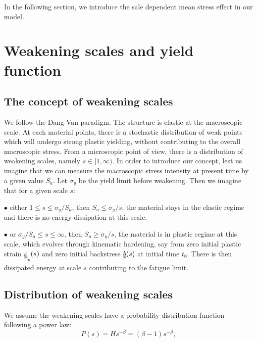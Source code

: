 In the following section, we introduce the sale dependent mean stress effect in our model.

\section{Weakening scales and yield function}
\label{sec:5.4}
\subsection{The concept of weakening scales} 

We follow the Dang Van paradigm. The structure is elastic at the macroscopic scale. At each material points, there is a stochastic distribution of weak points which will undergo strong plastic yielding, without contributing to the overall macroscopic stress. From a microscopic point of view, there is a distribution of weakening scales, namely $s\in[1,\infty)$. In order to introduce our concept, lest us imagine that we can measure the macroscopic stress intensity at present time by a given value $S_{a}$. Let $\sigma_y$ be the yield limit before weakening. Then we imagine that for a given scale $s$:

\vspace{6pt}
\noindent
$\bullet$ either $1\leqslant s\leqslant \sigma_y/S_{a}$, then $S_{a}\leqslant \sigma_y/s$, the material stays in the elastic regime and there is no energy dissipation at this scale.

\vspace{6pt}
\noindent
$\bullet$ or $\sigma_y/S_{a}\leqslant s\leqslant \infty$, then $S_{a}\geqslant \sigma_y/s$, the material is in plastic regime at this scale, which evolves through kinematic hardening, say from zero initial plastic strain $\uuline{\varepsilon}_p(s)$ and zero initial backstress $\uuline{b}(s)$ at initial time $t_0$. There is then dissipated energy at scale $s$ contributing to the fatigue limit.


\vspace{6pt}

\subsection{Distribution of weakening scales}

We assume the weakening scales have a  probability distribution function following a power law:
\begin{equation}
P(s) = Hs^{-\beta}=(\beta-1)s^{-\beta},
\label{eq.ps}
\end{equation}

